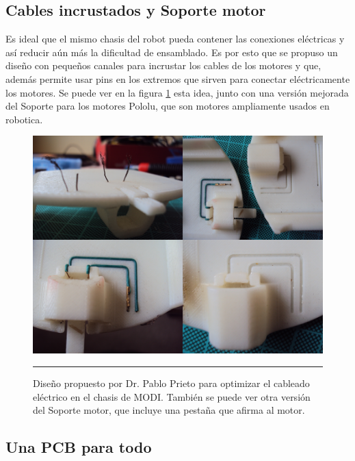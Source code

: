 \subsection{Cables incrustados y Soporte motor}
Es ideal que el mismo chasis del robot pueda contener las conexiones eléctricas y así reducir aún más la dificultad de ensamblado. Es por esto que se propuso un diseño con pequeños canales para incrustar los cables de los motores y que, además permite usar pins en los extremos que sirven para conectar eléctricamente los motores. Se puede ver en la figura \ref{fig:Cables incrustados} esta idea, junto con una versión mejorada del Soporte para los motores Pololu, que son motores ampliamente usados en robotica.

\begin{figure}[htbp]
	\centering
		\includegraphics[width=\textwidth]{./Pictures/wires.png}
		\rule{35em}{0.5pt}
	\caption[Cables incrustados y Soporte motor]{Diseño propuesto por Dr. Pablo Prieto para optimizar el cableado eléctrico en el chasis de MODI. También se puede ver otra versión del Soporte motor, que incluye una pestaña que afirma al motor.}
	\label{fig:Cables incrustados}
\end{figure}	







\subsection{Una PCB para todo}

